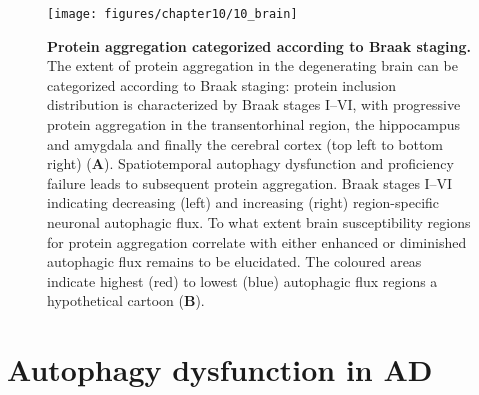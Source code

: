 \begin{figure}[!htbp]
  \center
  \texttt{[image: figures/chapter10/10\_brain]}
  \caption[Protein aggregation categorized according to Braak staging]{\textbf{Protein aggregation categorized according to Braak staging.} The extent of protein aggregation in the degenerating brain can be categorized according to Braak staging: protein inclusion distribution is characterized by Braak stages I–VI, with progressive protein aggregation in the transentorhinal region, the hippocampus and amygdala and finally the cerebral cortex (top left to bottom right) (\textbf{A}). Spatiotemporal autophagy dysfunction and proficiency failure leads to subsequent protein aggregation. Braak stages I–VI indicating decreasing (left) and increasing (right) region-specific neuronal autophagic flux. To what extent brain susceptibility regions for protein aggregation correlate with either enhanced or diminished autophagic flux remains to be elucidated. The coloured areas indicate highest (red) to lowest (blue) autophagic flux regions a hypothetical cartoon (\textbf{B}).}
  \label{fig:10_brain}
\end{figure}

\section{Autophagy dysfunction in AD}
